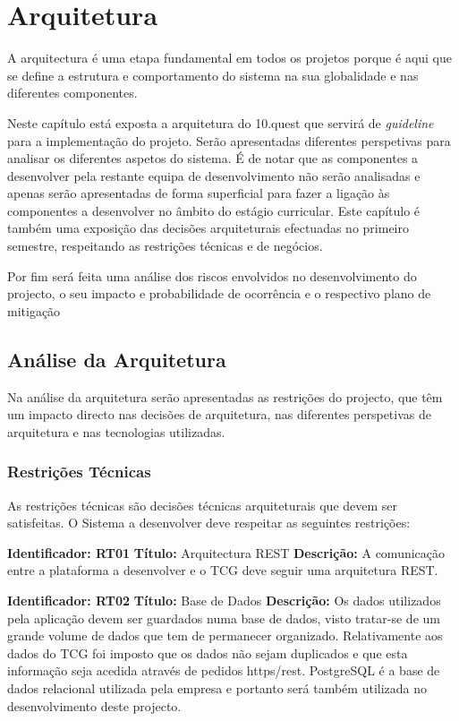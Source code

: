 
\chapter{Arquitetura}
\label{sec:arquitetura}

A arquitectura é uma etapa fundamental em todos os projetos porque é aqui que se define a estrutura e comportamento do sistema na sua globalidade e nas diferentes componentes.

Neste capítulo está exposta a arquitetura do 10.quest que servirá de \textit{guideline} para a implementação do projeto. Serão apresentadas diferentes perspetivas para analisar os diferentes aspetos do sistema. É de notar que as componentes a desenvolver pela restante equipa de desenvolvimento não serão analisadas e apenas serão apresentadas de forma superficial para fazer a ligação às componentes a desenvolver no âmbito do estágio curricular.
Este capítulo é também uma exposição das decisões arquiteturais efectuadas no primeiro semestre, respeitando as restrições técnicas e de negócios.

Por fim será feita uma análise dos riscos envolvidos no desenvolvimento do projecto, o seu impacto e probabilidade de ocorrência e o respectivo plano de mitigação




\section{Análise da Arquitetura}
\label{analisearq}

Na análise da arquitetura serão apresentadas as restrições do projecto, que têm um impacto directo nas decisões de arquitetura, nas diferentes perspetivas de arquitetura e nas tecnologias utilizadas.

\subsection{Restrições Técnicas}
As restrições técnicas são decisões técnicas arquiteturais que devem ser satisfeitas. O Sistema a desenvolver deve respeitar as seguintes restrições:

\textbf{Identificador: RT01}
\newline
\textbf{Título:} Arquitectura REST
\newline
\textbf{Descrição:} A comunicação entre a plataforma a desenvolver e o TCG deve seguir uma arquitetura REST.

\textbf{Identificador: RT02}
\newline
\textbf{Título:} Base de Dados
\newline
\textbf{Descrição:} Os dados utilizados pela aplicação devem ser guardados numa base de dados, visto tratar-se de um grande volume de dados que tem de permanecer organizado. Relativamente aos dados do TCG foi imposto que os dados não sejam duplicados e que esta informação seja acedida através de pedidos \acrshort{https}/\acrshort{rest}. PostgreSQL\cite{sql} é a base de dados relacional utilizada pela empresa e portanto será também utilizada no desenvolvimento deste projecto.

